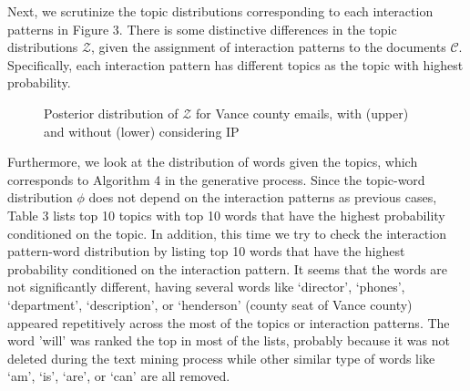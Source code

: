\documentclass[a4paper]{article}
\begin{document}
 Next, we scrutinize the topic distributions corresponding to each interaction patterns in Figure 3. There is some distinctive differences in the topic distributions $\mathcal{Z}$, given the assignment of interaction patterns to the documents $\mathcal{C}$. Specifically, each interaction pattern has different topics as the topic with highest probability.
 \begin{figure}[ht]
 	\centering
 	\caption{Posterior distribution of  $\mathcal{Z}$ for Vance county emails, with (upper) and without (lower) considering IP}
 	\label{fig:Vancebarplot}
 \end{figure}
 \normalsize
 \newline
 Furthermore, we look at the distribution of words given the topics, which corresponds to Algorithm 4 in the generative process. Since the topic-word distribution $\phi$ does not depend on the interaction patterns as previous cases, Table 3 lists top 10 topics with top 10 words that have the highest probability conditioned on the topic. In addition, this time we try to check the interaction pattern-word distribution by listing top 10 words that have the highest probability conditioned on the interaction pattern. It seems that the words are not significantly different, having several words like `director', `phones', `department', `description', or `henderson' (county seat of Vance county) appeared repetitively across the most of the topics or interaction patterns. The word 'will' was ranked the top in most of the lists, probably because it was not deleted during the text mining process while other similar type of words like `am', `is', `are', or `can' are all removed. \\
\end{document}
